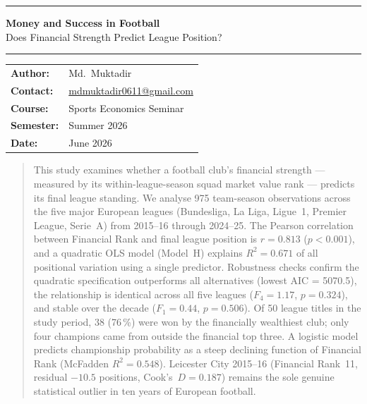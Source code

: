 \documentclass[11pt, a4paper]{article}
\begin{document}
\begin{titlepage}
  \thispagestyle{empty}
  \vspace*{2cm}
  {\color{NavyBlue}\hrule height 2pt}
  \vspace{0.6cm}
  {\huge\bfseries\color{NavyBlue} Money and Success in Football}\\[0.4cm]
  {\large\color{SteelBlue} Does Financial Strength Predict League Position?}
  \vspace{0.4cm}
  {\color{NavyBlue}\hrule height 1pt}
  \vspace{1.2cm}

  \begin{tabular}{ll}
    \textbf{Author:}    & Md.\ Muktadir \\[3pt]
    \textbf{Contact:}   & \href{mailto:mdmuktadir0611@gmail.com}{mdmuktadir0611@gmail.com} \\[3pt]
    \textbf{Course:}    & Sports Economics Seminar \\[3pt]
    \textbf{Semester:}  & Summer 2026 \\[3pt]
    \textbf{Date:}      & June 2026 \\
  \end{tabular}

  \vspace{1.8cm}
  \begin{abstract}
    \noindent
    This study examines whether a football club's financial strength --- measured
    by its within-league-season squad market value rank --- predicts its final
    league standing. We analyse 975 team-season observations across the five major
    European leagues (Bundesliga, La Liga, Ligue~1, Premier League, Serie~A) from
    2015--16 through 2024--25. The Pearson correlation between Financial Rank
    and final league position is \(r = 0.813\) (\(p < 0.001\)), and a quadratic
    OLS model (Model~H) explains \(R^{2} = 0.671\) of all positional variation
    using a single predictor. Robustness checks confirm the quadratic specification
    outperforms all alternatives (lowest AIC = 5070.5), the relationship is
    identical across all five leagues (\(F_{4} = 1.17\), \(p = 0.324\)),
    and stable over the decade (\(F_{1} = 0.44\), \(p = 0.506\)). Of 50 league
    titles in the study period, 38 (76\,\%) were won by the financially wealthiest
    club; only four champions came from outside the financial top three. A logistic
    model predicts championship probability as a steep declining function of
    Financial Rank (McFadden \(R^{2} = 0.548\)). Leicester City 2015--16
    (Financial Rank~11, residual $-10.5$ positions, Cook's~$D = 0.187$)
    remains the sole genuine statistical outlier in ten years of European football.


\end{abstract}
\end{titlepage}
\end{document}
